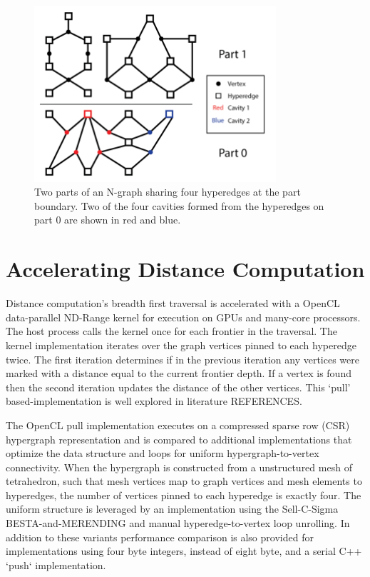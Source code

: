 \documentclass[graybox]{svmult}
\begin{document}
\begin{figure}
  \label{fig:partBdry}
  \centering
  \includegraphics[width=0.8\textwidth]{images/PartBoundary.png}
  \caption{Two parts of an N-graph sharing four hyperedges at the part boundary.
    Two of the four cavities formed from the hyperedges on part 0 are shown in
    red and blue.
  }
\end{figure}

\section{Accelerating Distance Computation} \label{sec:dist}

Distance computation's breadth first traversal is accelerated with a OpenCL
data-parallel ND-Range kernel for execution on GPUs and many-core processors.
The host process calls the kernel once for each frontier in the traversal.
The kernel implementation iterates over the graph vertices
pinned to each hyperedge twice.
The first iteration determines if in the previous iteration any vertices were
marked with a distance equal to the current frontier depth.
If a vertex is found then the second iteration updates the distance of the other
vertices.
This `pull' based-implementation is well explored in literature REFERENCES.

The OpenCL pull implementation executes on a compressed sparse row (CSR) hypergraph
representation and is compared to additional implementations that
optimize the data structure and loops for uniform hypergraph-to-vertex
connectivity.
When the hypergraph is constructed from a unstructured mesh of tetrahedron, such
that mesh vertices map to graph vertices and mesh elements to
hyperedges, the number of vertices pinned to each hyperedge is exactly four.
The uniform structure is leveraged by an implementation using the Sell-C-Sigma
BESTA-and-MERENDING and manual hyperedge-to-vertex loop unrolling.
In addition to these variants performance comparison is also provided for
implementations using four byte integers, instead of eight byte, and a serial
C++ `push` implementation.
\end{document}
